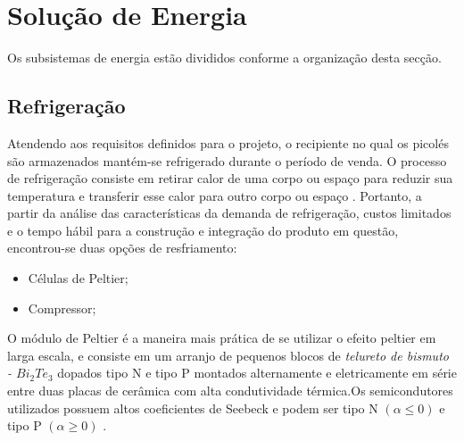 \begin{itemize}


\end{itemize}


\section{Solução de Energia}

Os subsistemas de energia estão divididos conforme a organização desta secção.

\subsection{Refrigeração}
Atendendo aos requisitos definidos para o projeto, o recipiente no qual os picolés são armazenados  mantém-se refrigerado durante o período de venda. O processo de refrigeração consiste em retirar calor de uma corpo ou espaço para reduzir sua temperatura e transferir esse calor para outro corpo ou espaço \cite{campos2010refrigeraccao}. Portanto, a partir da análise das características da demanda de refrigeração, custos limitados e o tempo hábil para a construção e integração do produto em questão, encontrou-se duas opções de resfriamento:

\begin{itemize}
\item Células de Peltier;
\end{itemize}

\begin{itemize}
\item Compressor;
\end{itemize}

O módulo de Peltier é a maneira mais prática de se utilizar o efeito peltier em larga escala, e consiste em um arranjo de pequenos blocos de \textit{telureto de bismuto - $Bi_{2}Te_{3}$} dopados tipo N e tipo P montados alternamente e eletricamente em série entre duas placas de cerâmica com alta condutividade térmica.Os semicondutores utilizados possuem altos coeficientes de Seebeck e podem ser tipo N $(\alpha \leq 0)$ e tipo P $(\alpha \geq 0)$  \cite{campos2010refrigeraccao}.

